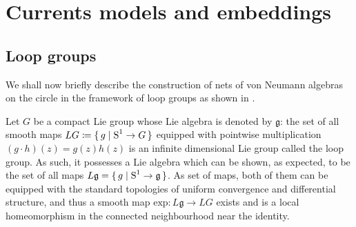 \chapter{Currents models and embeddings}\label{ch:Currents}
\minitoc\mtcskip

 \section{Loop groups}
 \label{Loop groups}
 We shall now briefly describe the construction of nets
 of von Neumann algebras on the circle in the framework
 of loop groups as shown in \cite{PS1986}. 
 
 Let $G$ be a compact Lie group whose Lie algebra is denoted
 by $\mathfrak{g}$: the set of all smooth maps
 $LG\coloneqq\set{g\mid \textrm{S}^1\to G}$ equipped with
 pointwise multiplication $(g\cdot h)(z)=g(z)h(z)$
 is an infinite dimensional Lie group called the loop
 group. As such, it possesses a Lie algebra which can
 be shown, as expected, to be the set of all maps 
 $L\mathfrak{g}=\set{g\mid \textrm{S}^1\to \mathfrak{g}}$. 
 As set of maps, both of them can be equipped with the standard
 topologies of uniform convergence and differential structure,
 and thus a smooth map $\textrm{exp}\colon L\mathfrak{g}
 \to LG$ exists and is a local homeomorphism in the connected
 neighbourhood near the identity.
 
